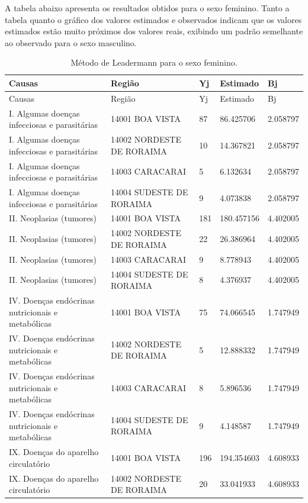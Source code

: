 \documentclass[
  12pt,
  a4paper,
]{scrreprt}
\begin{document}
A tabela abaixo apresenta os resultados obtidos para o sexo feminino.
Tanto a tabela quanto o gráfico dos valores estimados e observados
indicam que os valores estimados estão muito próximos dos valores reais,
exibindo um padrão semelhante ao observado para o sexo masculino.

\begin{longtable}[]{@{}lllll@{}}
\caption{Método de Leadermann para o sexo
feminino.}\label{T_17c09}\tabularnewline
\toprule\noalign{}
Causas & Região & Yj & Estimado & Bj \\
\midrule\noalign{}
\endfirsthead
\toprule\noalign{}
Causas & Região & Yj & Estimado & Bj \\
\midrule\noalign{}
\endhead
\bottomrule\noalign{}
\endlastfoot
I. Algumas doenças infecciosas e parasitárias & 14001 BOA VISTA & 87 &
86.425706 & 2.058797 \\
I. Algumas doenças infecciosas e parasitárias & 14002 NORDESTE DE
RORAIMA & 10 & 14.367821 & 2.058797 \\
I. Algumas doenças infecciosas e parasitárias & 14003 CARACARAI & 5 &
6.132634 & 2.058797 \\
I. Algumas doenças infecciosas e parasitárias & 14004 SUDESTE DE RORAIMA
& 9 & 4.073838 & 2.058797 \\
II. Neoplasias (tumores) & 14001 BOA VISTA & 181 & 180.457156 &
4.402005 \\
II. Neoplasias (tumores) & 14002 NORDESTE DE RORAIMA & 22 & 26.386964 &
4.402005 \\
II. Neoplasias (tumores) & 14003 CARACARAI & 9 & 8.778943 & 4.402005 \\
II. Neoplasias (tumores) & 14004 SUDESTE DE RORAIMA & 8 & 4.376937 &
4.402005 \\
IV. Doenças endócrinas nutricionais e metabólicas & 14001 BOA VISTA & 75
& 74.066545 & 1.747949 \\
IV. Doenças endócrinas nutricionais e metabólicas & 14002 NORDESTE DE
RORAIMA & 5 & 12.888332 & 1.747949 \\
IV. Doenças endócrinas nutricionais e metabólicas & 14003 CARACARAI & 8
& 5.896536 & 1.747949 \\
IV. Doenças endócrinas nutricionais e metabólicas & 14004 SUDESTE DE
RORAIMA & 9 & 4.148587 & 1.747949 \\
IX. Doenças do aparelho circulatório & 14001 BOA VISTA & 196 &
194.354603 & 4.608933 \\
IX. Doenças do aparelho circulatório & 14002 NORDESTE DE RORAIMA & 20 &
33.041933 & 4.608933 \\

\end{longtable}
\end{document}
